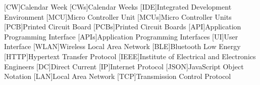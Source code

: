 % 
\begin{acronym}[STATCOM]    %
%
[CW]{Calendar Week}
[CWs]{Calendar Weeks}
%
[IDE]{Integrated Development Environment}
%
[MCU]{Micro Controller Unit}
[MCUs]{Micro Controller Units}
%
[PCB]{Printed Circuit Board}
[PCBs]{Printed Circuit Boards}
%
[API]{Application Programming Interface}
[APIs]{Application Programming Interfaces}
%
[UI]{User Interface}
%
[WLAN]{Wireless Local Area Network}
%
[BLE]{Bluetooth Low Energy}
%
[HTTP]{Hypertext Transfer Protocol}
%
[IEEE]{Institute of Electrical and Electronics Engineers}
%
[DC]{Direct Current}
%
[IP]{Internet Protocol}
%
[JSON]{JavaScript Object Notation}
%
[LAN]{Local Area Network}
%
[TCP]{Transmission Control Protocol}
%
\end{acronym}
%